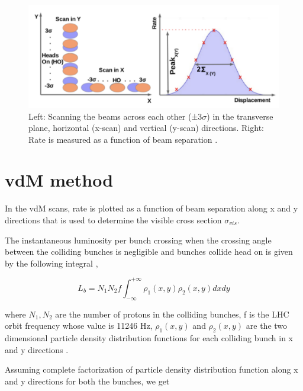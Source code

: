 \begin{figure}[h]
    \centering
    \includegraphics[width=1\textwidth]{ashish_thesis/vdm_method_new.png}
    \caption[vdM Scan Schematic]{Left: Scanning the beams across each other (±3$\sigma$) in the transverse plane, horizontal (x-scan) and vertical (y-scan) directions. Right: Rate is measured as a function of beam separation \cite{karacheban2017luminosity}.}
    \label{fig:vdm_scan_method}
\end{figure}

\section{vdM method}

In the vdM scans, rate is plotted as a function of beam separation along x and y directions that is used to determine the visible cross section $\sigma_{vis}$.

The instantaneous luminosity per bunch crossing when the crossing angle between the colliding bunches is negligible and bunches collide head on is given by the following integral \cite{CMS-PAS-LUM-13-001}, 

\begin{equation}
L_{b} = N_1 N_2 f \int^{+\infty}_{-\infty} \rho_1(x,y) \rho_2(x, y) dx dy 
\end{equation}

where $N_1, N_2$ are the number of protons in the colliding bunches, f is the LHC orbit frequency whose value is 11246 Hz,  $\rho_1(x,y)$ and $\rho_2(x,y)$ are the two dimensional particle density distribution functions for each colliding bunch in x and y directions  \cite{CMS-PAS-LUM-17-004}. 

Assuming complete factorization of particle density distribution function along x and y directions for both the bunches, we get 

